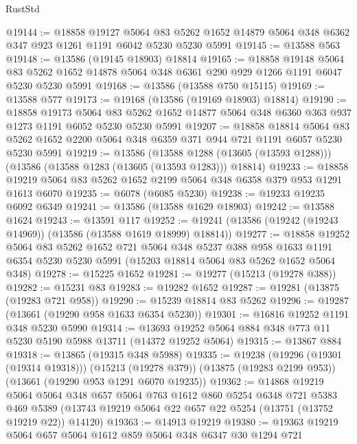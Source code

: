\begin{lexlean}{RustStd}
\begin{coremodule}
@19144 := @18858
    @19127
    @5064
    @83
    @5262
    @1652
    @14879
    @5064
    @348
    @6362
    @347
    @923
    @1261
    @1191
    @6042
    @5230
    @5230
    @5991
@19145 := @13588 @563
@19148 := @13586 (@19145 @18903) @18814
@19165 := @18858
    @19148
    @5064
    @83
    @5262
    @1652
    @14878
    @5064
    @348
    @6361
    @290
    @929
    @1266
    @1191
    @6047
    @5230
    @5230
    @5991
@19168 := @13586 (@13588 @750 @15115)
@19169 := @13588 @577
@19173 := @19168 (@13586 (@19169 @18903) @18814)
@19190 := @18858
    @19173
    @5064
    @83
    @5262
    @1652
    @14877
    @5064
    @348
    @6360
    @363
    @937
    @1273
    @1191
    @6052
    @5230
    @5230
    @5991
@19207 := @18858
    @18814
    @5064
    @83
    @5262
    @1652
    @2200
    @5064
    @348
    @6359
    @371
    @944
    @721
    @1191
    @6057
    @5230
    @5230
    @5991
@19219 := @13586
    (@13588 @1288 (@13605 (@13593 @1288)))
    (@13586 (@13588 @1283 (@13605 (@13593 @1283))) @18814)
@19233 := @18858 @19219 @5064 @83 @5262 @1652 @2199 @5064 @348 @6358 @379 @953 @1291 @1613 @6070
@19235 := @6078 (@6085 @5230)
@19238 := @19233 @19235 @6092 @6349
@19241 := @13586 (@13588 @1629 @18903)
@19242 := @13588 @1624
@19243 := @13591 @117
@19252 := @19241 (@13586 (@19242 (@19243 @14969)) (@13586 (@13588 @1619 @18999) @18814))
@19277 := @18858
    @19252
    @5064
    @83
    @5262
    @1652
    @721
    @5064
    @348
    @5237
    @388
    @958
    @1633
    @1191
    @6354
    @5230
    @5230
    @5991
    (@15203 @18814 @5064 @83 @5262 @1652 @5064 @348)
@19278 := @15225 @1652
@19281 := @19277 (@15213 (@19278 @388))
@19282 := @15231 @83
@19283 := @19282 @1652
@19287 := @19281 (@13875 (@19283 @721 @958))
@19290 := @15239 @18814 @83 @5262
@19296 := @19287 (@13661 (@19290 @958 @1633 @6354 @5230))
@19301 := @16816 @19252 @1191 @348 @5230 @5990
@19314 := @13693 @19252 @5064 @884 @348 @773 @11 @5230 @5190 @5988 @13711 (@14372 @19252 @5064)
@19315 := @13867 @884
@19318 := @13865 (@19315 @348 @5988)
@19335 := @19238
    (@19296 (@19301 (@19314 @19318)))
    (@15213 (@19278 @379))
    (@13875 (@19283 @2199 @953))
    (@13661 (@19290 @953 @1291 @6070 @19235))
@19362 := @14868
    @19219
    @5064
    @5064
    @348
    @657
    @5064
    @763
    @1612
    @860
    @5254
    @6348
    @721
    @5383
    @469
    @5389
    (@13743 @19219 @5064 @22 @657 @22 @5254 (@13751 (@13752 @19219 @22)) @14120)
@19363 := @14913 @19219
@19380 := @19363
    @19219
    @5064
    @657
    @5064
    @1612
    @859
    @5064
    @348
    @6347
    @30
    @1294
    @721

\end{coremodule}
\end{lexlean}
